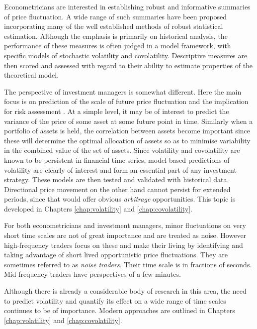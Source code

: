 Econometricians are interested in establishing robust and informative summaries of price fluctuation. A wide range of such summaries have been proposed incorporating many of the well established methods of robust statistical estimation. Although the emphasis is primarily on historical analysis, the performance of these measures is often judged in a model framework, with specific models of stochastic volatility and covolatility. Descriptive measures are then scored and assessed with regard to their ability to estimate properties of the theoretical model. 

The perspective of investment managers is somewhat different. Here the main focus is on prediction of the scale of future price fluctuation and the implication for risk assessment . At a simple level, it may be of interest to predict the variance of the price of some asset at some future point in time. Similarly when a portfolio of assets is held, the correlation between assets become important since these will determine the optimal allocation of assets so as to minimise variability in the combined value of the set of assets. Since volatility and covolatility are known to be persistent in financial time series, model based predictions of volatility are clearly of interest and form an essential part of any investment strategy.  These models are then tested and validated with historical data. Directional price movement on the other hand cannot persist for extended periods, since that would offer obvious \emph{arbitrage} opportunities. This topic is developed in Chapters \ref{chap:volatility} and \ref{chap:covolatility}.

For both econometricians and investment managers, minor fluctuations on very short time scales are not of great importance and are treated as noise. However high-frequency traders focus on these and make their living by identifying and taking advantage of short lived opportunistic price fluctuations. They are sometimes referred to as \emph{noise traders}. Their time scale is in fractions of seconds. Mid-frequency traders have perspectives of a few minutes.  

Although there is already a considerable body of research in this area, the need to predict volatility and quantify its effect on a wide range of time scales continues to be of importance. Modern approaches are outlined in Chapters \ref{chap:volatility} and \ref{chap:covolatility}.

